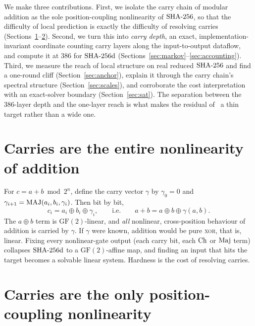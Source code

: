 \documentclass[11pt]{article}
\begin{document}
We make three contributions. First, we isolate the carry chain of modular
addition as the sole position-coupling nonlinearity of $\mathrm{SHA\text{-}256}$, so that the
difficulty of local prediction is exactly the difficulty of resolving
carries (Sections~\ref{sec:nonlin}--\ref{sec:coupling}). Second, we turn
this into \emph{carry depth}, an exact, implementation-invariant coordinate
counting carry layers along the input-to-output dataflow, and compute it at
$386$ for $\mathrm{SHA\text{-}256d}$ (Sections~\ref{sec:markov}--\ref{sec:accounting}). Third,
we measure the reach of local structure on real reduced $\mathrm{SHA\text{-}256}$ and find a
one-round cliff (Section~\ref{sec:anchor}), explain it through the carry
chain's spectral structure (Section~\ref{sec:scales}), and corroborate the
cost interpretation with an exact-solver boundary
(Section~\ref{sec:sat}). The separation between the $386$-layer depth and
the one-layer reach is what makes the residual of~\cite{paperI} a thin
target rather than a wide one.

\section{Carries are the entire nonlinearity of addition}\label{sec:nonlin}

For $c = a + b \bmod 2^{n}$, define the carry vector $\gamma$ by
$\gamma_0 = 0$ and $\gamma_{i+1} = \mathrm{MAJ}(a_i,b_i,\gamma_i)$. Then bit by
bit,
\[
  c_i = a_i \oplus b_i \oplus \gamma_i,
  \qquad\text{i.e.}\qquad
  a + b = a \oplus b \oplus \gamma(a,b).
\]
The $a\oplus b$ term is $\mathrm{GF}(2)$-linear, and \emph{all} nonlinear,
cross-position behaviour of addition is carried by $\gamma$. If $\gamma$
were known, addition would be pure \textsc{xor}, that is, linear. Fixing
every nonlinear-gate output (each carry bit, each $\mathrm{Ch}$ or $\mathrm{Maj}$ term)
collapses $\mathrm{SHA\text{-}256d}$ to a $\mathrm{GF}(2)$-affine map, and finding an input
that hits the target becomes a solvable linear system. Hardness is the cost
of resolving carries.

\section{Carries are the only position-coupling nonlinearity}\label{sec:coupling}
\end{document}
